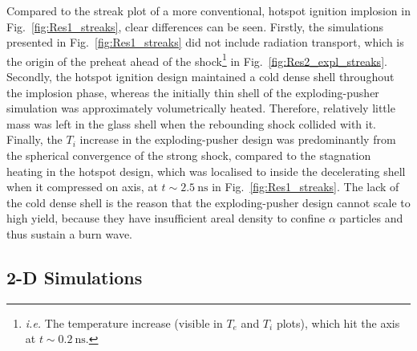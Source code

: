 Compared to the streak plot of a more conventional, hotspot ignition implosion in Fig.~\ref{fig:Res1_streaks}, clear differences can be seen.
Firstly, the simulations presented in Fig.~\ref{fig:Res1_streaks} did not include radiation transport, which is the origin of the preheat ahead of the shock\footnote{\textit{i.e.} The temperature increase (visible in $T_e$ and $T_i$ plots), which hit the axis at $t\sim0.2\ \text{ns}$.} in Fig.~\ref{fig:Res2_expl_streaks}.
Secondly, the hotspot ignition design maintained a cold dense shell throughout the implosion phase, whereas the initially thin shell of the exploding-pusher simulation was approximately volumetrically heated.
Therefore, relatively little mass was left in the glass shell when the rebounding shock collided with it.
Finally, the $T_i$ increase in the exploding-pusher design was predominantly from the spherical convergence of the strong shock, compared to the stagnation heating in the hotspot design, which was localised to inside the decelerating shell when it compressed on axis, at $t\sim2.5\ \text{ns}$ in Fig.~\ref{fig:Res1_streaks}.
The lack of the cold dense shell is the reason that the exploding-pusher design cannot scale to high yield, because they have insufficient areal density to confine $\alpha$ particles and thus sustain a burn wave.

\subsection{2-D Simulations}%
\label{sec:Res2_expl2D}

